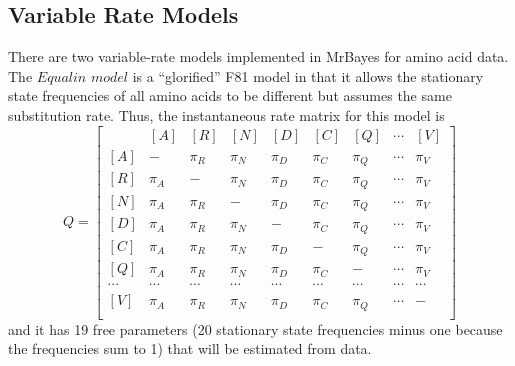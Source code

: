 \documentclass[12pt]{book}
\begin{document}
\subsection{Variable Rate Models}
There are two variable-rate models implemented in MrBayes for amino acid data. The $Equalin$
$model$ is a ``glorified'' F81 model in that it allows the stationary state frequencies of all
amino acids to be different but assumes the same substitution rate. Thus, the instantaneous rate
matrix for this model is
\[
Q=\begin{bmatrix}
    & [A] & [R] & [N] & [D] & [C] & [Q] & \cdots & [V]\\ 
 [A]& - & \pi_{R} & \pi_{N} & \pi_{D}& \pi_{C}& \pi_{Q} & \cdots & \pi_V\\ 
 [R]& \pi_{A} &- &  \pi_{N} & \pi_{D}& \pi_{C}& \pi_{Q} & \cdots & \pi_V\\ 
 [N]& \pi_{A} &\pi_{R} &- &   \pi_{D}& \pi_{C}& \pi_{Q} & \cdots & \pi_V\\ 
 [D]& \pi_{A} &\pi_{R} &  \pi_{N}&- &  \pi_{C}& \pi_{Q} & \cdots & \pi_V\\ 
 [C]& \pi_{A} &\pi_{R} &  \pi_{N}&  \pi_{D}&- & \pi_{Q} & \cdots & \pi_V\\ 
 [Q]& \pi_{A} &\pi_{R} &  \pi_{N}&  \pi_{D}& \pi_{C} &- & \cdots & \pi_V\\  
 \cdots& \cdots& \cdots& \cdots& \cdots& \cdots& \cdots& \cdots& \cdots\\
 [V]& \pi_{A} &\pi_{R} &  \pi_{N}&  \pi_{D}& \pi_{C} &\pi_Q & \cdots &- \\ 
\end{bmatrix}
\]
and it has 19 free parameters (20 stationary state frequencies minus one because the frequencies
sum to 1) that will be estimated from data.
\end{document}
